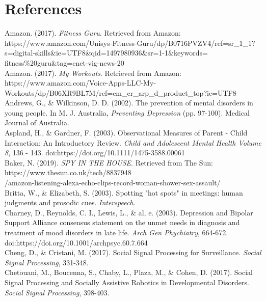 \documentclass[a4paper,11pt]{report}
\begin{document}
\chapter{References}
Amazon. (2017). \textit{Fitness Guru}. Retrieved from Amazon: https://www.amazon.com/Unisys-Fitness-Guru/dp/B0716PVZV4/ref=sr\_1\_1?s=digital-skills\&ie=UTF8\&qid=1497980936\&sr=1-1\&keywords=\\fitness\%20guru\&tag=cnet-vig-news-20\\

Amazon. (2017). \textit{My Workouts}. Retrieved from Amazon: https://www.amazon.com/Voice-Apps-LLC-My-Workouts/dp/B06XR9BL7M/ref=cm\_cr\_arp\_d\_product\_top?ie=UTF8\\

Andrews, G., \& Wilkinson, D. D. (2002). The prevention of mental disorders in young people. In M. J. Australia, \textit{Preventing Depression} (pp. 97-100). Medical Journal of Australia.\\

Aspland, H., \& Gardner, F. (2003). Observational Measures of Parent - Child Interaction: An Introductory Review. \textit{Child and Adolescent Mental Health Volume 8}, 136 - 143. doi:https://doi.org/10.1111/1475-3588.00061\\

Baker, N. (2019). \textit{SPY IN THE HOUSE}. Retrieved from The Sun: https://www.thesun.co.uk/tech/8837948\\/amazon-listening-alexa-echo-clips-record-woman-shower-sex-assault/\\

Britta, W., \& Elizabeth, S. (2003). Spotting "hot spots" in meetings: human judgments and prosodic cues. \textit{Interspeech}.\\

Charney, D., Reynolds, C. I., Lewis, L., \& al, e. (2003). Depression and Bipolar Support Alliance consensus statement on the unmet needs in diagnosis and treatment of mood disorders in late life. \textit{Arch Gen Phychiatry}, 664-672. doi:https://doi.org/10.1001/archpsyc.60.7.664\\

Cheng, D., \& Cristani, M. (2017). Social Signal Processing for Surveillance. \textit{Social Signal Processing}, 331-348.\\

Chetouani, M., Boucenna, S., Chaby, L., Plaza, M., \& Cohen, D. (2017). Social Signal Processing and Socially Assistive Robotics in Developmental Disorders. \textit{Social Signal Processing}, 398-403.\\
\end{document}
